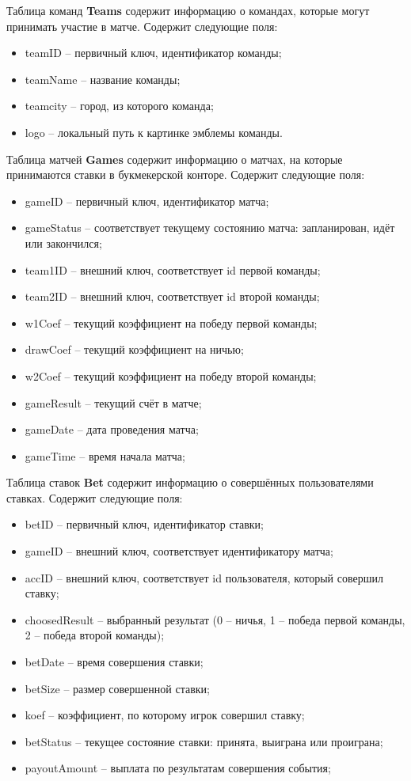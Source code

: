 Таблица команд \textbf{Teams} содержит информацию о командах, которые могут принимать участие в матче.
Содержит следующие поля:
\begin{itemize}
	\item teamID -- первичный ключ, идентификатор команды;
	\item teamName -- название команды;
	\item teamcity -- город, из которого команда;
	\item logo -- локальный путь к картинке эмблемы команды.
\end{itemize}

Таблица матчей \textbf{Games} содержит информацию о матчах, на которые принимаются ставки в букмекерской конторе.
Содержит следующие поля:
\begin{itemize}
	\item gameID -- первичный ключ, идентификатор матча;
	\item gameStatus -- соответствует текущему состоянию матча: запланирован, идёт или закончился;
	\item team1ID -- внешний ключ, соответствует id первой команды;
	\item team2ID -- внешний ключ, соответствует id второй команды;
	\item w1Coef -- текущий коэффициент на победу первой команды;
	\item drawCoef -- текущий коэффициент на ничью;
	\item w2Coef -- текущий коэффициент на победу второй команды;
	\item gameResult -- текущий счёт в матче;
	\item gameDate -- дата проведения матча;
	\item gameTime -- время начала матча;
\end{itemize}

Таблица ставок \textbf{Bet} содержит информацию о совершённых пользователями ставках.
Содержит следующие поля:
\begin{itemize}
	\item betID -- первичный ключ, идентификатор ставки;
	\item gameID -- внешний ключ, соответствует идентификатору матча;
	\item accID -- внешний ключ, соответствует id пользователя, который совершил ставку;
	\item choosedResult -- выбранный результат (0 -- ничья, 1 -- победа первой команды, 2 -- победа второй команды);
	\item betDate -- время совершения ставки;
	\item betSize -- размер совершенной ставки;
	\item koef -- коэффициент, по которому игрок совершил ставку;
	\item betStatus -- текущее состояние ставки: принята, выиграна или проиграна;
	\item payoutAmount -- выплата по результатам совершения события;
\end{itemize}

